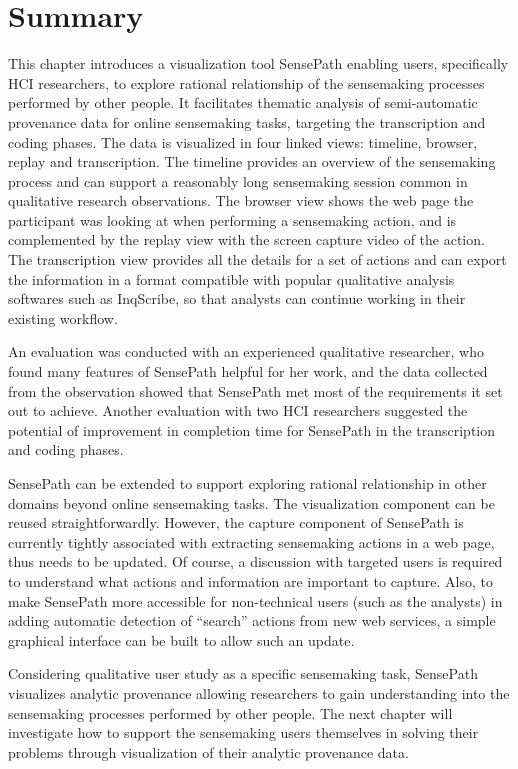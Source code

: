 \section{Summary}
This chapter introduces a visualization tool SensePath enabling users, specifically HCI researchers, to explore rational relationship of the sensemaking processes performed by other people. It facilitates thematic analysis of semi-automatic provenance data for online sensemaking tasks, targeting the transcription and coding phases. The data is visualized in four linked views: timeline, browser, replay and transcription. The timeline provides an overview of the sensemaking process and can support a reasonably long sensemaking session common in qualitative research observations. The browser view shows the web page the participant was looking at when performing a sensemaking action, and is complemented by the replay view with the screen capture video of the action. The transcription view provides all the details for a set of actions and can export the information in a format compatible with popular qualitative analysis softwares such as InqScribe, so that analysts can continue working in their existing workflow.  

An evaluation was conducted with an experienced qualitative researcher, who found many features of SensePath helpful for her work, and the data collected from the observation showed that SensePath met most of the requirements it set out to achieve. Another evaluation with two HCI researchers suggested the potential of improvement in completion time for SensePath in the transcription and coding phases.

SensePath can be extended to support exploring rational relationship in other domains beyond online sensemaking tasks. The visualization component can be reused straightforwardly. However, the capture component of SensePath is currently tightly associated with extracting sensemaking actions in a web page, thus needs to be updated. Of course, a discussion with targeted users is required to understand what actions and information are important to capture.  Also, to make SensePath more accessible for non-technical users (such as the analysts) in adding automatic detection of ``search'' actions from new web services, a simple graphical interface can be built to allow such an update.

Considering qualitative user study as a specific sensemaking task, SensePath visualizes analytic provenance allowing researchers to gain understanding into the sensemaking processes performed by other people. The next chapter will investigate how to support the sensemaking users themselves in solving their problems through visualization of their analytic provenance data.
